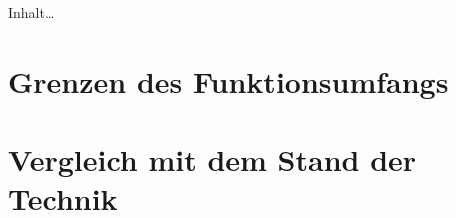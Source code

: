 \label{ch_refl}

Inhalt\ldots

\section{Grenzen des Funktionsumfangs}


\section{Vergleich mit dem Stand der Technik}
